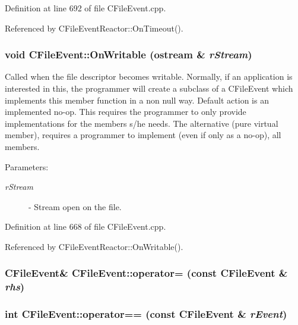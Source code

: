 Definition at line 692 of file CFile\-Event.cpp.

Referenced by CFile\-Event\-Reactor::On\-Timeout().
\subsubsection{\setlength{\rightskip}{0pt plus 5cm}void CFile\-Event::On\-Writable (ostream \& {\em r\-Stream})\hspace{0.3cm}{\tt  [virtual]}}\label{classCFileEvent_a16}


Called when the file descriptor becomes writable. Normally, if an application is interested in this, the programmer will create a  subclass of a CFile\-Event which implements this member function in a non null way. Default action is an implemented no-op. This requires the programmer to only provide implementations for the members s/he needs. The alternative (pure virtual member), requires a programmer to implement (even if only as a no-op), all members. \begin{Desc}
\item[Parameters: ]\par
\begin{description}
\item[{\em 
r\-Stream}]- Stream open on the file. \end{description}
\end{Desc}


Definition at line 668 of file CFile\-Event.cpp.

Referenced by CFile\-Event\-Reactor::On\-Writable().
\subsubsection{\setlength{\rightskip}{0pt plus 5cm}CFile\-Event\& CFile\-Event::operator= (const CFile\-Event \& {\em rhs})\hspace{0.3cm}{\tt  [private]}}\label{classCFileEvent_c1}


\subsubsection{\setlength{\rightskip}{0pt plus 5cm}int CFile\-Event::operator== (const CFile\-Event \& {\em r\-Event})\hspace{0.3cm}{\tt  [private]}}\label{classCFileEvent_c2}


